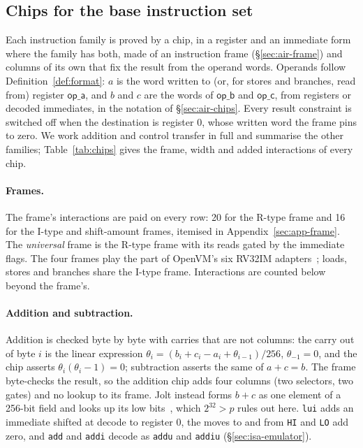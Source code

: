 \subsection{Chips for the base instruction set}
\label{sec:base}

Each instruction family is proved by a chip, in a register and an immediate form where the family has both, made of an instruction frame (\S\ref{sec:air-frame}) and columns of its own that fix the result from the operand words. Operands follow Definition~\ref{def:format}: $a$ is the word written to (or, for stores and branches, read from) register $\mathsf{op\_a}$, and $b$ and $c$ are the words of $\mathsf{op\_b}$ and $\mathsf{op\_c}$, from registers or decoded immediates, in the notation of \S\ref{sec:air-chips}. Every result constraint is switched off when the destination is register 0, whose written word the frame pins to zero. We work addition and control transfer in full and summarise the other families; Table~\ref{tab:chips} gives the frame, width and added interactions of every chip.

\paragraph{Frames.} The frame's interactions are paid on every row: 20 for the R-type frame and 16 for the I-type and shift-amount frames, itemised in Appendix~\ref{sec:app-frame}. The \emph{universal} frame is the R-type frame with its reads gated by the immediate flags. The four frames play the part of OpenVM's six RV32IM adapters~\citep{openvm}; loads, stores and branches share the I-type frame. Interactions are counted below beyond the frame's.

\paragraph{Addition and subtraction.}\label{sec:base-arith} Addition is checked byte by byte with carries that are not columns: the carry out of byte $i$ is the linear expression $\theta_i = (b_i + c_i - a_i + \theta_{i-1})/256$, $\theta_{-1} = 0$, and the chip asserts $\theta_i(\theta_i - 1) = 0$; subtraction asserts the same of $a + c = b$. The frame byte-checks the result, so the addition chip adds four columns (two selectors, two gates) and no lookup to its frame. Jolt instead forms $b + c$ as one element of a 256-bit field and looks up its low bits~\citep{jolt}, which $2^{32} > p$ rules out here. \texttt{lui} adds an immediate shifted at decode to register 0, the moves to and from \texttt{HI} and \texttt{LO} add zero, and \texttt{add} and \texttt{addi} decode as \texttt{addu} and \texttt{addiu} (\S\ref{sec:isa-emulator}).

